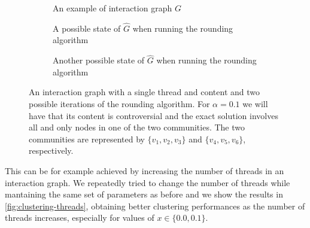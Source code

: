 \begin{figure}
	\begin{center}
		\begin{subfigure}{0.3\textwidth}
			\centering
			\caption{An example of interaction graph $G$}
			\label{fig:rounding-interaction-graph-example}
		\end{subfigure}
		\quad
		\begin{subfigure}{0.3\textwidth}
			\centering
			\caption{A possible state of $\hat{G}$ when running the rounding
				algorithm}
			\label{fig:rounding-run-unlucky}
		\end{subfigure}
		\quad
		\begin{subfigure}{0.3\textwidth}
			\centering
			\caption{Another possible state of $\hat{G}$ when running the
				rounding algorithm}
			\label{fig:rounding-run-lucky}
		\end{subfigure}
	\end{center}
	\caption[An interaction graph with a single thread and content and two
		possible iterations of the rounding algorithm]{An interaction graph with a
		single thread and content and two possible iterations of the rounding
		algorithm. For $\alpha = 0.1$ we will have that its content is
		controversial and the exact solution involves all and only nodes in one of
		the two communities. The two communities are represented by $\{ v_1, v_2,
			v_3\}$ and $\{ v_4, v_5, v_6\}$, respectively.}
\end{figure}

This can be for example achieved by increasing the number of threads
in an interaction graph. We repeatedly tried to change the number of threads
while mantaining the same set of parameters as before and we show the results
in \autoref{fig:clustering-threads}, obtaining better clustering
performances as the number of threads increases, especially for values of
$x \in \{ 0.0, 0.1 \}$.

